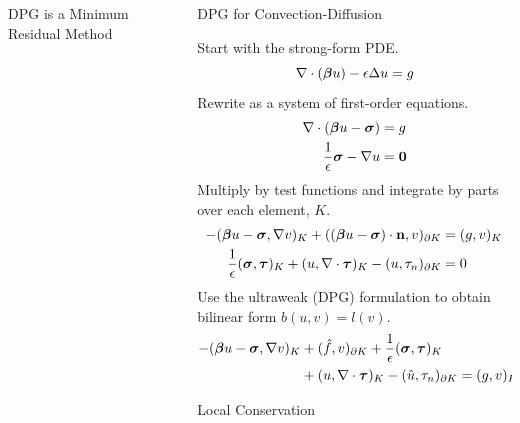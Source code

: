 \documentclass[final]{beamer}
\newlength{\sepwid}
\newlength{\onecolwid}
\begin{document}
\begin{frame}[t]
\begin{columns}[t]
\begin{column}{\onecolwid}
\begin{block}{DPG is a Minimum Residual Method}
\end{block}



\end{column} %

\begin{column}{\sepwid}\end{column} %

\begin{column}{\onecolwid} %


\begin{block}{DPG for Convection-Diffusion}

Start with the strong-form PDE.
\[
\nabla\cdot(\boldsymbol\beta u)-\epsilon\Delta u = g
\]
Rewrite as a system of first-order equations.
\begin{align*}
\nabla\cdot(\boldsymbol\beta u-\boldsymbol\sigma)&=g\\
\frac{1}{\epsilon}\boldsymbol\sigma-\nabla u&=\boldsymbol0
\end{align*}
Multiply by test functions and integrate by parts over each element, $K$.
\begin{align*}
-(\boldsymbol\beta u-\boldsymbol\sigma,\nabla v)_K+((\boldsymbol\beta
u-\boldsymbol\sigma)\cdot\mathbf{n},v)_{\partial K}&=(g,v)_K\\
\frac{1}{\epsilon}(\boldsymbol\sigma,\boldsymbol\tau)_K+(u,\nabla\cdot\boldsymbol\tau)_K
-(u,\tau_n)_{\partial K}&=0
\end{align*}
Use the ultraweak (DPG) formulation to obtain bilinear form $b(u,v)=l(v)$.
\begin{align*}
-(\boldsymbol\beta u-\boldsymbol\sigma,\nabla v)_K&+(\hat f,v)_{\partial K}
+ \frac{1}{\epsilon}(\boldsymbol\sigma,\boldsymbol\tau)_K\\
&+(u,\nabla\cdot\boldsymbol\tau)_K
-(\hat u,\tau_n)_{\partial K}=(g,v)_K
\end{align*}

\end{block}


\begin{block}{Local Conservation}


\end{block}
\end{column}
\end{columns}
\end{frame}
\end{document}
